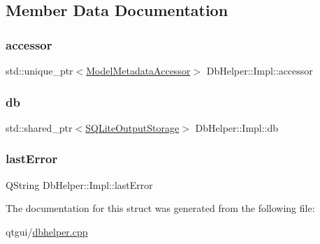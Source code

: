 \subsection{Member Data Documentation}
\mbox{\label{struct_db_helper_1_1_impl_a39220518d42578b9c5f2f3787ba25389}} 
\subsubsection{\texorpdfstring{accessor}{accessor}}
{\footnotesize\ttfamily std\+::unique\+\_\+ptr$<$\mbox{\hyperlink{class_model_metadata_accessor}{Model\+Metadata\+Accessor}}$>$ Db\+Helper\+::\+Impl\+::accessor}

\mbox{\label{struct_db_helper_1_1_impl_a1921a07d93a197d4f7399df90d1739a6}} 
\subsubsection{\texorpdfstring{db}{db}}
{\footnotesize\ttfamily std\+::shared\+\_\+ptr$<$\mbox{\hyperlink{class_s_q_lite_output_storage}{S\+Q\+Lite\+Output\+Storage}}$>$ Db\+Helper\+::\+Impl\+::db}

\mbox{\label{struct_db_helper_1_1_impl_abdeba3d54eb4d0335a75eb8e23e627be}} 
\subsubsection{\texorpdfstring{lastError}{lastError}}
{\footnotesize\ttfamily Q\+String Db\+Helper\+::\+Impl\+::last\+Error}



The documentation for this struct was generated from the following file\+:\begin{DoxyCompactItemize}
\item 
qtgui/\mbox{\hyperlink{dbhelper_8cpp}{dbhelper.\+cpp}}\end{DoxyCompactItemize}

